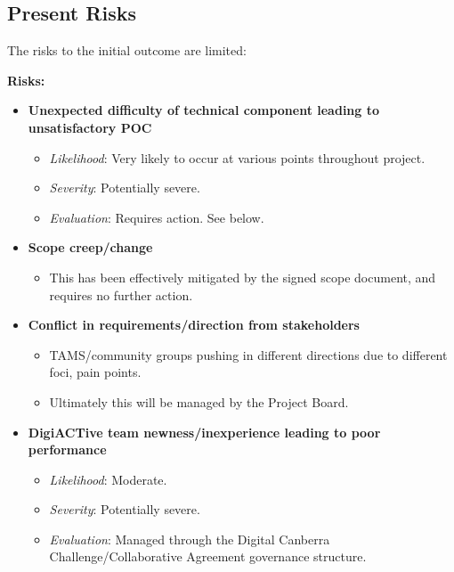 \documentclass[12pt,a4paper,twosided]{article}
\begin{document}
\subsection{Present Risks}

The risks to the initial outcome are limited:

\textbf{Risks:}

\begin{itemize}
\itemsep1pt\parskip0pt
\item
  \textbf{Unexpected difficulty of technical component leading to
  unsatisfactory POC}

  \begin{itemize}
  \itemsep1pt\parskip0pt
  \item
    \emph{Likelihood}: Very likely to occur at various points throughout
    project.
  \item
    \emph{Severity}: Potentially severe.
  \item
    \emph{Evaluation}: Requires action. See below.
  \end{itemize}
\item
  \textbf{Scope creep/change}

  \begin{itemize}
  \itemsep1pt\parskip0pt
  \item
    This has been effectively mitigated by the signed scope document,
    and requires no further action.
  \end{itemize}
\item
  \textbf{Conflict in requirements/direction from stakeholders}

  \begin{itemize}
  \itemsep1pt\parskip0pt
  \item
    TAMS/community groups pushing in different directions due to
    different foci, pain points.
  \item
    Ultimately this will be managed by the Project Board.
  \end{itemize}
\item
  \textbf{DigiACTive team newness/inexperience leading to poor
  performance}

  \begin{itemize}
  \itemsep1pt\parskip0pt
  \item
    \emph{Likelihood}: Moderate.
  \item
    \emph{Severity}: Potentially severe.
  \item
    \emph{Evaluation}: Managed through the Digital Canberra
    Challenge/Collaborative Agreement governance structure.
  \end{itemize}
\end{itemize}
\end{document}

